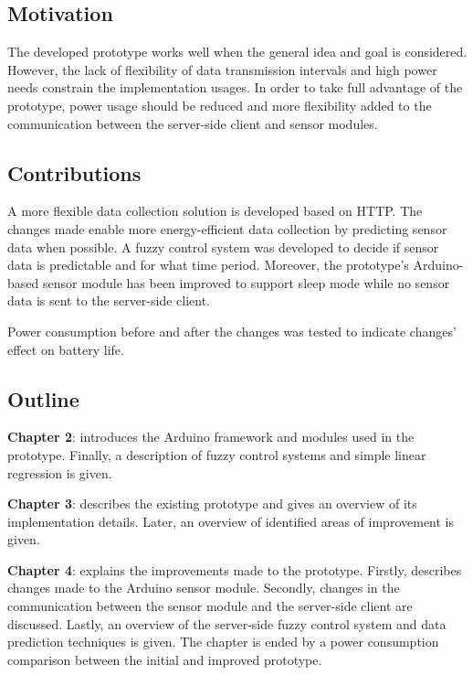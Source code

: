 \subsection{Motivation}
The developed prototype \cite{prev_thesis} works well when the general idea and goal is considered. However, the lack of flexibility of data transmission intervals and high power needs constrain the implementation usages. In order to take full advantage of the prototype, power usage should be reduced and more flexibility added to the communication between the server-side client and sensor modules.  

\subsection{Contributions}

A more flexible data collection solution is developed based on HTTP. The changes made enable more energy-efficient data collection by predicting sensor data when possible. A fuzzy control system was developed to decide if sensor data is predictable and for what time period.  Moreover, the prototype's Arduino-based sensor module has been improved to support sleep mode while no sensor data is sent to the server-side client. 

Power consumption before and after the changes was tested to indicate changes' effect on battery life. 

\subsection{Outline}


\noindent \textbf{Chapter 2}: introduces the Arduino framework and modules used in the prototype. Finally, a description of fuzzy control systems and simple linear regression is given.
\newline

\noindent \textbf{Chapter 3}: describes the existing prototype and gives an overview of its implementation details. Later, an overview of identified areas of improvement is given.
\newline

\noindent \textbf{Chapter 4}: explains the improvements made to the prototype. Firstly, describes changes made to the Arduino sensor module. Secondly, changes in the communication between the sensor module and the server-side client are discussed. Lastly, an overview of the server-side fuzzy control system and data prediction techniques is given. The chapter is ended by a power consumption comparison between the initial and improved prototype.
\newline





